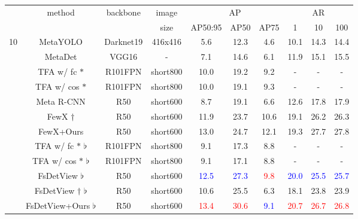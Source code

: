 \documentclass[10pt,twocolumn,letterpaper]{article}
\begin{document}
\begin{table*}
\begin{center}
\begin{tabular}{|c|c|c|c|c|c|c|c|c|c|}
\hline
\rowcolor{white}
\multirow{2}{*}{shots} & \multirow{2}{*}{method} & \multirow{2}{*}{backbone} & image & \multicolumn{3}{c|}{AP} & \multicolumn{3}{c|}{AR} \\ \cline{5-10} 
  &  &  & size & AP50:95 & AP50 & AP75 & 1 & 10 & 100 \\
\hline\hline
\multirow{11}{*}{10}& MetaYOLO \cite{kang2019few}    & Darknet19   & 416x416 & 5.6 & 12.3 & 4.6 & 10.1 & 14.3 & 14.4 \\
& MetaDet \cite{wang2019meta} & VGG16  & - & 7.1 & 14.6 & 6.1 & 11.9 & 15.1 & 15.5 \\
& TFA w/ fc $\ast$ \cite{wang2020frustratingly}  & R101FPN &short800 & 10.0 & 19.2 & 9.2 & - & - & - \\
& TFA w/ cos $\ast$ \cite{wang2020frustratingly}  & R101FPN &short800 & 10.0 & 19.1 & 9.3 & - & - & - \\
& Meta R-CNN \cite{yan2019meta} & R50  & short600 & 8.7 & 19.1 & 6.6 & 12.6 & 17.8 & 17.9 \\
& FewX $\dagger$  \cite{fan2020fsod}  & R50 & short600 & 11.9 & 23.7 & 10.6 & 19.1 & 26.2 & 26.3 \\
\rowcolor{Gray}
\cellcolor{white}& FewX+Ours & R50 & short600 & 13.0 & 24.7 & 12.1 & 19.3 & 27.7 & 27.8 \\ \cline{2-10}
&  TFA w/ fc $\ast$ $\flat$ \cite{wang2020frustratingly} & R101FPN & short800 & 9.1 & 17.3 & 8.8 & - & - & - \\
&  TFA w/ cos $\ast$ $\flat$ \cite{wang2020frustratingly} & R101FPN & short800 & 9.1 & 17.1 & 8.8 & - & - & - \\
& FsDetView $\flat$ \cite{xiao2020few}  & R50 & short600 & \textcolor{blue}{12.5} & \textcolor{blue}{27.3} & \textcolor{red}{9.8} & \textcolor{blue}{20.0} & \textcolor{blue}{25.5} & \textcolor{blue}{25.7} \\
& FsDetView $\dagger$  $\flat$  & R50 & short600 & 10.6 & 25.5 & 6.3 & 18.1 & 23.8 & 23.9 \\
\rowcolor{Gray}
\cellcolor{white} & FsDetView+Ours $\flat$ & R50 & short600 & \textcolor{red}{13.4} & \textcolor{red}{30.6} & \textcolor{blue}{9.1} & \textcolor{red}{20.7} & \textcolor{red}{26.7}  & \textcolor{red}{26.8} \\
\hline \hline


\end{tabular}
\end{center}
\end{table*}
\end{document}
